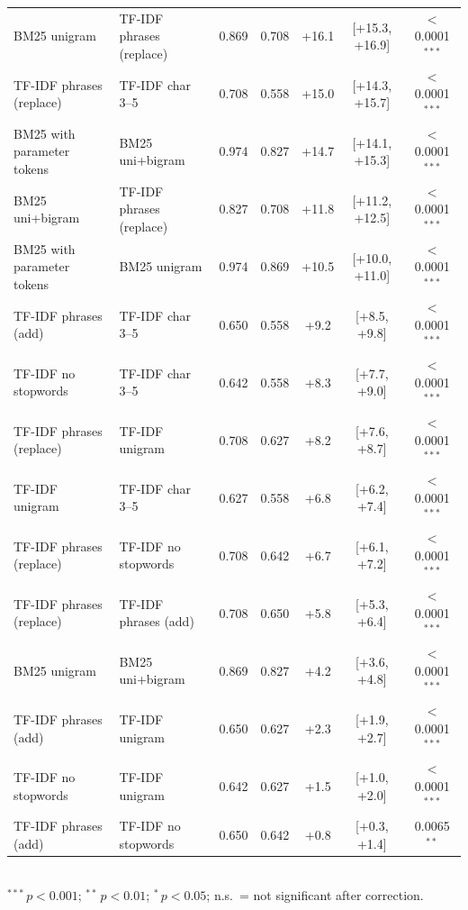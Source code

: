 \begin{table}[ht]
{\begin{tabular}{llccccc}
BM25 unigram & TF-IDF phrases (replace) & 0.869 & 0.708 & +16.1 & [+15.3, +16.9] & $<$0.0001$^{***}$ \\
TF-IDF phrases (replace) & TF-IDF char 3--5 & 0.708 & 0.558 & +15.0 & [+14.3, +15.7] & $<$0.0001$^{***}$ \\
BM25 with parameter tokens & BM25 uni+bigram & 0.974 & 0.827 & +14.7 & [+14.1, +15.3] & $<$0.0001$^{***}$ \\
BM25 uni+bigram & TF-IDF phrases (replace) & 0.827 & 0.708 & +11.8 & [+11.2, +12.5] & $<$0.0001$^{***}$ \\
BM25 with parameter tokens & BM25 unigram & 0.974 & 0.869 & +10.5 & [+10.0, +11.0] & $<$0.0001$^{***}$ \\
TF-IDF phrases (add) & TF-IDF char 3--5 & 0.650 & 0.558 & +9.2 & [+8.5, +9.8] & $<$0.0001$^{***}$ \\
TF-IDF no stopwords & TF-IDF char 3--5 & 0.642 & 0.558 & +8.3 & [+7.7, +9.0] & $<$0.0001$^{***}$ \\
TF-IDF phrases (replace) & TF-IDF unigram & 0.708 & 0.627 & +8.2 & [+7.6, +8.7] & $<$0.0001$^{***}$ \\
TF-IDF unigram & TF-IDF char 3--5 & 0.627 & 0.558 & +6.8 & [+6.2, +7.4] & $<$0.0001$^{***}$ \\
TF-IDF phrases (replace) & TF-IDF no stopwords & 0.708 & 0.642 & +6.7 & [+6.1, +7.2] & $<$0.0001$^{***}$ \\
TF-IDF phrases (replace) & TF-IDF phrases (add) & 0.708 & 0.650 & +5.8 & [+5.3, +6.4] & $<$0.0001$^{***}$ \\
BM25 unigram & BM25 uni+bigram & 0.869 & 0.827 & +4.2 & [+3.6, +4.8] & $<$0.0001$^{***}$ \\
TF-IDF phrases (add) & TF-IDF unigram & 0.650 & 0.627 & +2.3 & [+1.9, +2.7] & $<$0.0001$^{***}$ \\
TF-IDF no stopwords & TF-IDF unigram & 0.642 & 0.627 & +1.5 & [+1.0, +2.0] & $<$0.0001$^{***}$ \\
TF-IDF phrases (add) & TF-IDF no stopwords & 0.650 & 0.642 & +0.8 & [+0.3, +1.4] & 0.0065$^{**}$ \\
\bottomrule
\end{tabular}
}
\\[2pt]{\footnotesize $^{***}\,p<0.001$; $^{**}\,p<0.01$; $^{*}\,p<0.05$; n.s.\ = not significant after correction.}
\end{table}
